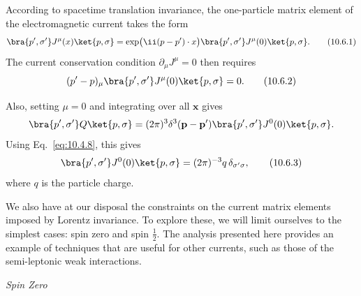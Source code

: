 According to spacetime translation invariance, the one-particle matrix element
of the electromagnetic current takes the form
\begin{equation}
  \bra{p',\sigma'}J^\mu(x)\ket{p,\sigma}
  =\exp\bigl(\ii(p-p')\cdot x\bigr)
  \bra{p',\sigma'}J^\mu(0)\ket{p,\sigma}.
  \tag{10.6.1}\label{eq:10.6.1}
\end{equation}
The current conservation condition $\partial_\mu J^\mu=0$ then requires
\begin{equation}
  (p'-p)_\mu\bra{p',\sigma'}J^\mu(0)\ket{p,\sigma}=0.
  \tag{10.6.2}\label{eq:10.6.2}
\end{equation}

Also, setting $\mu=0$ and integrating over all $\mathbf{x}$ gives
\begin{equation*}
  \bra{p',\sigma'}Q\ket{p,\sigma}
  =(2\pi)^3\delta^3(\mathbf{p}-\mathbf{p}')
  \bra{p',\sigma'}J^0(0)\ket{p,\sigma}.
\end{equation*}
Using Eq.~\eqref{eq:10.4.8}, this gives
\begin{equation}
  \bra{p',\sigma'}J^0(0)\ket{p,\sigma}
  =(2\pi)^{-3}q\,\delta_{\sigma'\sigma},
  \tag{10.6.3}\label{eq:10.6.3}
\end{equation}
where $q$ is the particle charge.

We also have at our disposal the constraints on the current matrix elements
imposed by Lorentz invariance. To explore these, we will limit ourselves to
the simplest cases: spin zero and spin $\frac12$. The analysis presented here
provides an example of techniques that are useful for other currents, such as
those of the semi-leptonic weak interactions.

\begin{center}
  \emph{Spin Zero}
\end{center}

